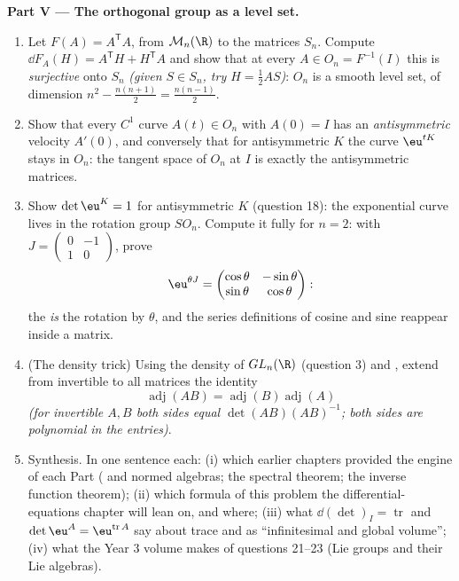 \begin{problem}
\medskip
\noindent\textbf{Part V --- The orthogonal group as a level
set.}
\begin{enumerate}[resume]
  \item Let $F(A) = A^{\mathsf T}A$, from $\mathcal M_n(\R)$ to
        the  matrices $S_n$. Compute $\dd F_A(H) =
        A^{\mathsf T}H + H^{\mathsf T}A$ and show that at every
        $A \in O_n = F^{-1}(I)$ this  is
        \emph{surjective} onto $S_n$ \emph{(given $S \in S_n$,
        try $H = \frac12 AS$)}: $O_n$ is a smooth level set,
        of dimension $n^2 - \frac{n(n+1)}2 = \frac{n(n-1)}2$.
  \item Show that every $C^1$ curve $A(t) \in O_n$ with $A(0) =
        I$ has an \emph{antisymmetric} velocity $A'(0)$, and
        conversely that for antisymmetric $K$ the curve
        $\eu^{tK}$ stays in $O_n$: the tangent space of $O_n$
        at $I$ is exactly the antisymmetric matrices.
  \item Show $\det\eu^{K} = 1$ for antisymmetric $K$ (question
        18): the exponential curve lives in the rotation group
        $SO_n$. Compute it fully for $n = 2$: with $J =
        \begin{pmatrix}0 & -1\\ 1 & 0\end{pmatrix}$, prove
        \[
        \eu^{\theta J} = \begin{pmatrix} \cos\theta &
        -\sin\theta\\ \sin\theta & \cos\theta\end{pmatrix} :
        \]
        the  \emph{is} the rotation by
        $\theta$, and the series definitions of cosine and sine
        reappear inside a matrix.
  \item (The density trick) Using the density of $GL_n(\R)$
        (question 3) and , extend from invertible to
        all matrices the identity
        \[
        \operatorname{adj}(AB) =
        \operatorname{adj}(B)\operatorname{adj}(A)
        \]
        \emph{(for invertible $A, B$ both sides equal
        $\det(AB)(AB)^{-1}$; both sides are polynomial in the
        entries)}.
  \item Synthesis. In one sentence each: (i) which earlier
        chapters provided the engine of each Part
        ( and normed algebras; the spectral
        theorem; the inverse function theorem); (ii) which
        formula of this problem the differential-equations
        chapter will lean on, and where; (iii) what
        $\dd(\det)_I = \operatorname{tr}$ and $\det\eu^A =
        \eu^{\operatorname{tr}A}$ say about trace and
         as ``infinitesimal and global volume'';
        (iv) what the Year 3 volume makes of questions
        21--23 (Lie groups and their Lie algebras).
\end{enumerate}
\end{problem}
